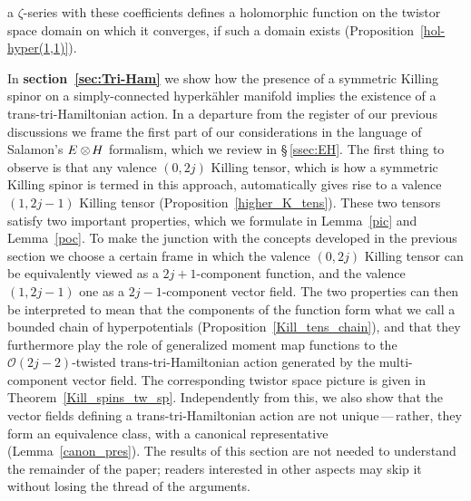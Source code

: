 \documentclass[11pt]{amsart}
\theoremstyle{remark}
\theoremstyle{remark}
\theoremstyle{definition}
\theoremstyle{definition}
\theoremstyle{definition}
\newcommand{\0}{{\scriptstyle 0'}} %
\newcommand{\1}{{\scriptstyle 1'}}
\newcommand{\pt}{\hspace{1pt}} %
\newcommand{\npt}{\hspace{-1pt}} %
\begin{document}
a $\zeta$-\pt series with these coefficients defines a holomorphic function on the twistor space domain on which it converges, if such a domain exists (Proposition~\ref{hol-hyper(1,1)}). 



In \textbf{section~\ref{sec:Tri-Ham}} we show how the presence of a symmetric Killing spinor on a simply-connected hyperk\"ahler manifold implies the existence of a trans-tri-Hamiltonian action. In a departure from the register of our previous discussions we frame the first part of our considerations in the language of Salamon's \mbox{$E \otimes\npt H$} formalism, which we review in \mbox{\S\,\ref{ssec:EH}}. The first thing to observe is that any valence \mbox{$(0,2j)$} Killing tensor, which is how a symmetric Killing spinor is termed in this approach, automatically gives rise to a valence \mbox{$(1,2j-1)$}  Killing tensor (Proposition~\ref{higher_K_tens}). These two tensors satisfy two important properties, which we formulate in Lemma~\ref{pic} and Lemma~\ref{poc}. To make the junction with the concepts developed in the previous section we choose a certain frame in which the valence \mbox{$(0,2j)$} Killing tensor can be equivalently viewed as a \mbox{$2j+1$\pt-\pt component} function, and the valence \mbox{$(1,2j-1)$} one as a \mbox{$2j-1$\pt-\pt component} vector field. The two properties can then be interpreted to mean that the components of the function form what we call a bounded chain of hyperpotentials (Proposition~\ref{Kill_tens_chain}), and that they furthermore play the role of generalized moment map functions to the \mbox{$\mathcal{O}(2j-2)$-twisted} trans-tri-Hamiltonian action generated by the multi-component vector field. The corresponding twistor space picture is given in Theorem~\ref{Kill_spins_tw_sp}. Independently from this, we also show that the vector fields defining a trans-tri-Ha\-mil\-to\-ni\-an action are not unique\,---\,rather, they form an equivalence class, with a canonical representative (Lemma~\ref{canon_pres}). The results of this section are not needed to understand the remainder of the paper; readers interested in other aspects may skip it without losing the thread of the arguments. 
\end{document}
